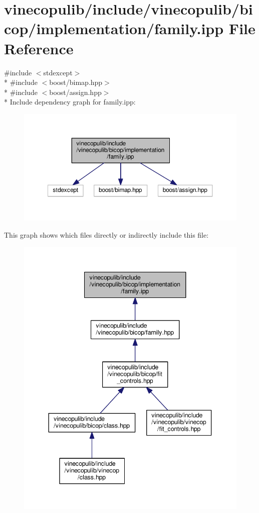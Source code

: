 \hypertarget{family_8ipp}{}\section{vinecopulib/include/vinecopulib/bicop/implementation/family.ipp File Reference}
\label{family_8ipp}
{\ttfamily \#include $<$stdexcept$>$}\\*
{\ttfamily \#include $<$boost/bimap.\+hpp$>$}\\*
{\ttfamily \#include $<$boost/assign.\+hpp$>$}\\*
Include dependency graph for family.\+ipp\+:
\nopagebreak
\begin{figure}[H]
\begin{center}
\leavevmode
\includegraphics[width=350pt]{family_8ipp__incl}
\end{center}
\end{figure}
This graph shows which files directly or indirectly include this file\+:
\nopagebreak
\begin{figure}[H]
\begin{center}
\leavevmode
\includegraphics[width=344pt]{family_8ipp__dep__incl}
\end{center}
\end{figure}
